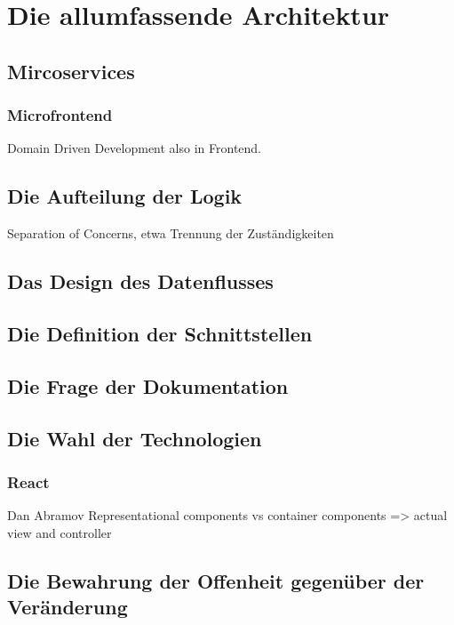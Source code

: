\chapter{Die allumfassende Architektur}
\label{chap:die-allumfassende-architektur}

\section{Mircoservices}

\subsection{Microfrontend}
Domain Driven Development also in Frontend.

\section{Die Aufteilung der Logik}
\label{sec:die-aufteilung-der-logic}
Separation of Concerns, etwa Trennung der Zuständigkeiten

\section{Das Design des Datenflusses}
\label{sec:das-design-des-datenflusses}

\section{Die Definition der Schnittstellen}
\label{sec:die-definition-der-schnittstellen}

\section{Die Frage der Dokumentation}

\section{Die Wahl der Technologien}

\subsection{React}
Dan Abramov Representational components vs container components => actual view and controller


\section{Die Bewahrung der Offenheit gegenüber der Veränderung}
\label{sec:die-bewahrung-der-offenheit-gegenueber-der-veraenderung}

